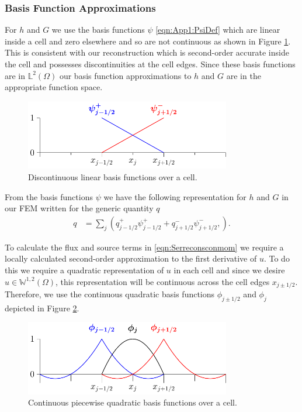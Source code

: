 \subsubsection{Basis Function Approximations}
For $h$ and $G$ we use the basis functions $\psi$ \eqref{eqn:App1:PsiDef} which are linear inside a cell and zero elsewhere and so are not continuous as shown in Figure \ref{fig:P1DiscBasis}. This is consistent with our reconstruction which is second-order accurate inside the cell and possesses discontinuities at the cell edges. Since these basis functions are in $\mathbb{L}^2(\Omega)$ our basis function approximations to $h$ and $G$ are in the appropriate function space.
\begin{figure}
	\centering
	\includegraphics[width=0.8\textwidth]{./chp3/figures/P1.pdf}
	\caption{Discontinuous linear basis functions over a cell.}
	\label{fig:P1DiscBasis}
\end{figure}

From the basis functions $\psi$ we have the following representation for $h$ and $G$ in our FEM written for the generic quantity $q$
\begin{align}
\label{eqn:FEapproxtohG}
q &= \sum_j \left( q^+_{j-1/2}\psi^+_{j-1/2}  + q^-_{j+1/2}\psi^-_{j+1/2}, \right).
\end{align}

To calculate the flux and source terms in \eqref{eqn:Serreconsconmom} we require a locally  calculated second-order approximation to the first derivative of $u$. To do this we require a quadratic representation of $u$ in each cell and since we desire $u\in\mathbb{W}^{1,2}(\Omega)$, this representation will be continuous across the cell edges $x_{j \pm 1/2}$. Therefore, we use the continuous quadratic basis functions $\phi_{j\pm1/2} $ and $\phi_{j} $ depicted in Figure \ref{fig:P2ContBasis}.
\begin{figure}
	\centering
	\includegraphics[width=0.8\textwidth]{./chp3/figures/P2.pdf}
	\caption{Continuous piecewise quadratic basis functions over a cell.}
	\label{fig:P2ContBasis}
\end{figure}

